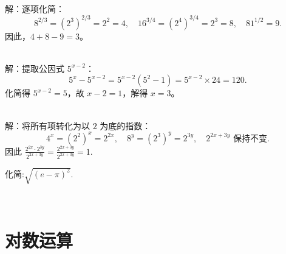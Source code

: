 \documentclass{ctexart}
\newenvironment{MyAnswer}[1][] %
{
    \begin{tcolorbox}[breakable, colframe=blue]
    \begin{Answer}[#1] \color{blue} \kaishu
        }  %
    {\end{Answer}
\end{tcolorbox}
}
\begin{document}
\begin{MyAnswer}[ref={ex:exponent2}]
    \Question {}\\ 
    解：逐项化简：
    $$
    8^{2/3} = (2^3)^{2/3} = 2^2 = 4, \quad 
    16^{3/4} = (2^4)^{3/4} = 2^3 = 8, \quad 
    81^{1/2} = 9.
    $$
    因此，$4 + 8 - 9 = 3$。  
 
    \Question {}\\ 
    解：提取公因式 $5^{x-2}$：
    $$
    5^{x} - 5^{x-2} = 5^{x-2}(5^2 - 1) = 5^{x-2} \times 24 = 120.
    $$
    化简得 $5^{x-2} = 5$，故 $x - 2 = 1$，解得 $x = 3$。

    \Question {}\\ 
    解：将所有项转化为以 $2$ 为底的指数：
    $$
    4^x = (2^2)^x = 2^{2x}, \quad 8^y = (2^3)^y = 2^{3y}, \quad 2^{2x + 3y} \text{ 保持不变}.
    $$
    因此
    $
    \frac{2^{2x} \cdot 2^{3y}}{2^{2x + 3y}} = \frac{2^{2x + 3y}}{2^{2x + 3y}} = 1.
    $ %
\end{MyAnswer}


\begin{Exercise}[title={指数运算小练习3}, label={ex:exponent3}]
    \Question  化简:$\sqrt{(e - \pi)^2}$.
\end{Exercise}



\begin{MyAnswer}[ref={ex:exponent3}]
    \Question {}\\ 


\end{MyAnswer}
\clearpage

\section{对数运算}
\end{document}
